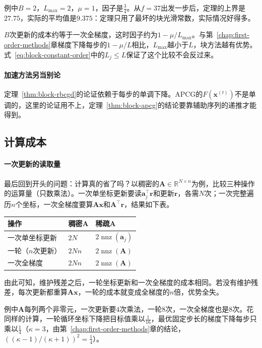例中$B=2$，$L_{\max}=2$，$\mu=1$，因子是$\tfrac34$。从$f=37$出发一步后，定理的上界是$27.75$，实际的平均值是$9.375$：定理只用了最坏的块光滑常数，实际情况好得多。

$B$次更新的成本约等于一次全梯度，这时因子约为$1-\mu/L_{\max}$。与第~\ref{chap:first-order-methods}章梯度下降每步的$1-\mu/L$相比，$L_{\max}$越小于$L$，块方法越有优势。式~\eqref{eq:block-constant-order}中的$L_j\leq L$保证了这个比较不会反过来。

\paragraph{加速方法另当别论}
定理~\ref{thm:block-rbcgd}的论证依赖于每步的单调下降。APCG的$F(\bm{x}^{(t)})$不是单调的，这里的论证用不上，定理~\ref{thm:block-apcg}的结论要靠辅助序列的递推才能得到。

\subsection{计算成本}
\label{sec:block-cost}

\paragraph{一次更新的读取量}
最后回到开头的问题：计算真的省了吗？以稠密的$\bm{A}\in\mathbb{R}^{N\times n}$为例，比较三种操作的运算量（只数乘法）。一次单坐标更新要读$\bm{a}_j^\top\bm{r}$和更新$\bm{r}$，各需$N$次；一次完整遍历$n$个坐标，一次全梯度要算$\bm{A}\bm{x}$和$\bm{A}^\top\bm{r}$，结果如下表。

\begin{BookInlineTable}
\centering
\begin{tabular}{lll}
\toprule
操作 & 稠密$\bm{A}$ & 稀疏$\bm{A}$\\
\midrule
一次单坐标更新 & $2N$ & $2\operatorname{nnz}(\bm{a}_j)$\\
一轮（$n$次更新） & $2Nn$ & $2\operatorname{nnz}(\bm{A})$\\
一次全梯度 & $2Nn$ & $2\operatorname{nnz}(\bm{A})$\\
\bottomrule
\end{tabular}
\end{BookInlineTable}

由此可知，维护残差之后，一轮坐标更新和一次全梯度的成本相同。若没有维护残差，每次更新都重算$\bm{A}\bm{x}$，一轮的成本就变成全梯度的$n$倍，优势全失。

例中$\bm{A}$每列两个非零元，一次更新要$4$次乘法，一轮$8$次，一次全梯度也是$8$次。花同样的计算，一轮循环坐标下降把目标值乘以$\tfrac{1}{16}$，最优固定步长的梯度下降每步只乘以$\tfrac14$（$\kappa=3$，由第~\ref{chap:first-order-methods}章的结论，$((\kappa-1)/(\kappa+1))^2=\tfrac14$）。

